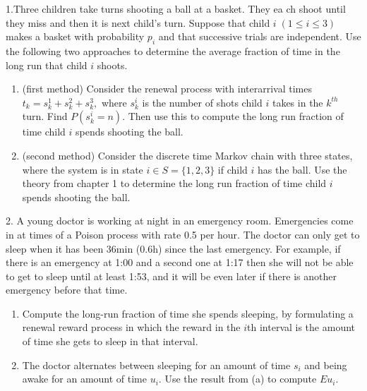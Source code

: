 \documentclass[12pt]{article}
\begin{document}

1.Three children take turns shooting a ball at a basket. They ea
ch shoot until they miss and then it is next child’s turn. Suppose that child $i\;(1\le i \le 3)$ makes a basket with probability $p_i$ and that successive trials are independent. Use the following two approaches to determine the average fraction of time in the long run that child $i$ shoots.
\begin{enumerate}[label=(\alph*)]
    \item (first method) Consider the renewal process with interarrival times $t_k = s_k^1 + s_k^2 + s_k^3,$ where $s_k^i$ is the number of shots child $i$ takes in the $k^{th}$ turn. Find $P(s_k^i = n)$. Then use this to compute the long run fraction of time child $i$ spends shooting the ball.
    
    \item (second method) Consider the discrete time Markov chain with three states, where the system is in state $i\in S = \{1,2,3\}$ if child $i$ has the ball. Use the theory from chapter 1 to determine the long run fraction of time child $i$ spends shooting the ball.
\end{enumerate}

2. A young doctor is working at night in an emergency room. Emergencies come in at times of a Poison process with rate 0.5 per hour. The doctor can only get to sleep when it has been 36min (0.6h) since the last emergency. For example, if there is an emergency at 1:00 and a second one at 1:17 then she will not be able to get to sleep until at least 1:53, and it will be even later if there is another emergency before that time.
\begin{enumerate}[label=(\alph*)]
    \item Compute the long-run fraction of time she spends sleeping, by formulating a renewal reward process in which the reward in the $i$th interval is the amount of time she gets to sleep in that interval.
    \item The doctor alternates between sleeping for an amount of time $s_i$ and being awake for an amount of time $u_i$. Use the result from (a) to compute $Eu_i$.
\end{enumerate}
\end{document}
